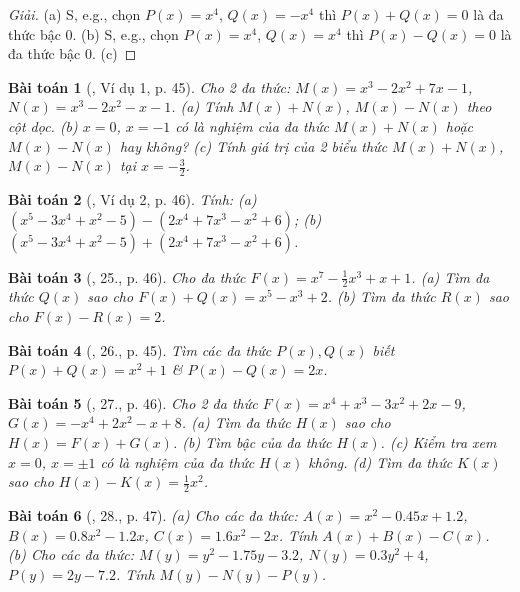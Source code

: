 \documentclass{article}
\newtheorem{baitoan}{Bài toán}
\begin{document}
\begin{proof}[Giải]
	(a) S, e.g., chọn $P(x) = x^4$, $Q(x) = -x^4$ thì $P(x) + Q(x) = 0$ là đa thức bậc 0. (b) S, e.g., chọn $P(x) = x^4$, $Q(x) = x^4$ thì $P(x) - Q(x) = 0$ là đa thức bậc 0. (c)
\end{proof}

\begin{baitoan}[\cite{SBT_Toan_7_Canh_Dieu_tap_2}, Ví dụ 1, p. 45]
	Cho 2 đa thức: $M(x) =  x^3 - 2x^2 + 7x - 1$, $N(x) = x^3 - 2x^2 - x - 1$. (a) Tính $M(x) + N(x)$, $M(x) - N(x)$ theo cột dọc. (b) $x = 0$, $x = -1$ có là nghiệm của đa thức $M(x) + N(x)$ hoặc $M(x) - N(x)$ hay không? (c) Tính giá trị của 2 biểu thức $M(x) + N(x)$, $M(x) - N(x)$ tại $x = -\frac{3}{2}$.
\end{baitoan}

\begin{baitoan}[\cite{SBT_Toan_7_Canh_Dieu_tap_2}, Ví dụ 2, p. 46]
	Tính: (a) $(x^5 - 3x^4 + x^2 - 5) - (2x^4 + 7x^3 - x^2 + 6)$; (b) $(x^5 - 3x^4 + x^2 - 5) + (2x^4 + 7x^3 - x^2 + 6)$.
\end{baitoan}

\begin{baitoan}[\cite{SBT_Toan_7_Canh_Dieu_tap_2}, 25., p. 46]
	Cho đa thức $F(x) = x^7 - \frac{1}{2}x^3 + x + 1$. (a) Tìm đa thức $Q(x)$ sao cho $F(x) + Q(x) = x^5 - x^3 + 2$. (b) Tìm đa thức $R(x)$ sao cho $F(x) - R(x) = 2$.
\end{baitoan}

\begin{baitoan}[\cite{SBT_Toan_7_Canh_Dieu_tap_2}, 26., p. 45]
	Tìm các đa thức $P(x),Q(x)$ biết $P(x) + Q(x) = x^2 + 1$ \& $P(x) - Q(x) = 2x$.
\end{baitoan}

\begin{baitoan}[\cite{SBT_Toan_7_Canh_Dieu_tap_2}, 27., p. 46]
	Cho 2 đa thức $F(x) = x^4 + x^3 - 3x^2 + 2x - 9$, $G(x) = -x^4 + 2x^2 - x + 8$. (a) Tìm đa thức $H(x)$ sao cho $H(x) = F(x) + G(x)$. (b) Tìm bậc của đa thức $H(x)$. (c) Kiểm tra xem $x = 0$, $x = \pm1$ có là nghiệm của đa thức $H(x)$ không. (d) Tìm đa thức $K(x)$ sao cho $H(x) - K(x) = \frac{1}{2}x^2$.
\end{baitoan}

\begin{baitoan}[\cite{SBT_Toan_7_Canh_Dieu_tap_2}, 28., p. 47]
	(a) Cho các đa thức: $A(x) = x^2 - 0.45x + 1.2$, $B(x) = 0.8x^2 - 1.2x$, $C(x) = 1.6x^2 - 2x$. Tính $A(x) + B(x) - C(x)$. (b) Cho các đa thức: $M(y) = y^2 - 1.75y - 3.2$, $N(y) = 0.3y^2 + 4$, $P(y) = 2y - 7.2$. Tính $M(y) - N(y) - P(y)$.
\end{baitoan}
\end{document}
